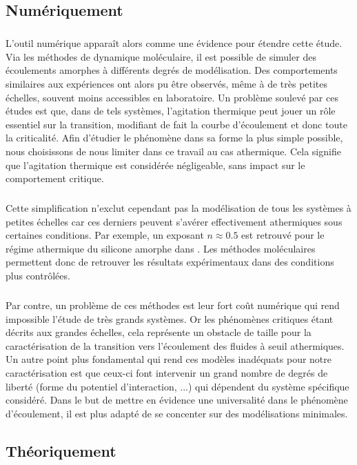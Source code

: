 \subsection{Numériquement}

\subparagraph{}L'outil numérique apparaît alors comme une évidence pour étendre cette étude. Via les méthodes de dynamique moléculaire, il est possible de simuler des écoulements amorphes à différents degrés de modélisation. Des comportements similaires aux expériences ont  alors pu être observés, même à de très petites échelles, souvent moins accessibles en laboratoire. Un problème soulevé par ces études est que, dans de tels systèmes, l'agitation thermique peut jouer un rôle essentiel sur la transition, modifiant de fait la courbe d'écoulement \cite{delbecq_rheological_2023} et donc toute la criticalité. Afin d'étudier le phénomène dans sa forme la plus simple possible, nous choisissons de nous limiter dans ce travail au cas athermique. Cela signifie que l'agitation thermique est considérée négligeable, sans impact sur le comportement critique. 

\subparagraph{}Cette simplification n'exclut cependant pas la modélisation de tous les systèmes à petites échelles car ces derniers peuvent s'avérer effectivement athermiques sous certaines conditions. Par exemple, un exposant $n\approx 0.5$ est retrouvé pour le régime athermique du silicone amorphe dans \cite{fusco_rheological_2014}. Les méthodes moléculaires permettent donc de retrouver les résultats expérimentaux dans des conditions plus contrôlées. 

\subparagraph{}Par contre, un problème de ces méthodes est leur fort coût numérique qui rend impossible l'étude de très grands systèmes. Or les phénomènes critiques étant décrits aux grandes échelles, cela représente un obstacle de taille pour la caractérisation de la transition vers l'écoulement des fluides à seuil athermiques. Un autre point plus fondamental qui rend ces modèles inadéquats pour notre caractérisation est que ceux-ci font intervenir un grand nombre de degrés de liberté (forme du potentiel d'interaction, ...) qui dépendent du système spécifique considéré. Dans le but de mettre en évidence une universalité dans le phénomène d'écoulement, il est plus adapté de se concenter sur des modélisations minimales.


\subsection{Théoriquement}


